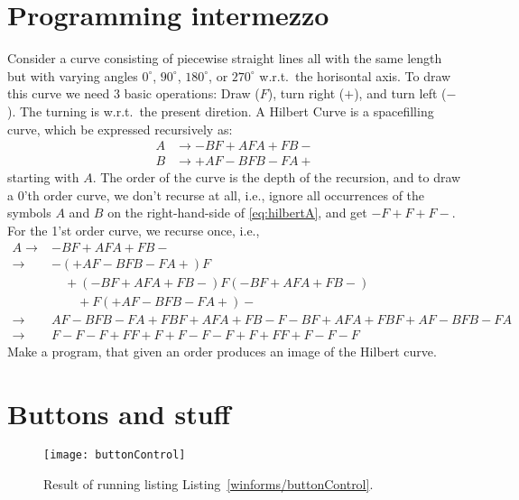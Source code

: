 \section{Programming intermezzo}
\begin{problem}
  Consider a curve consisting of piecewise straight lines all with the same length but with varying angles $0^{\circ}$, $90^{\circ}$, $180^{\circ}$, or $270^{\circ}$ w.r.t.\ the horisontal axis. To draw this curve we need 3 basic operations: Draw ($F$), turn right ($+$), and turn left ($-$). The turning is w.r.t.\ the present diretion. A Hilbert Curve is a spacefilling curve, which be expressed recursively as:
\begin{align}
  A &\rightarrow -BF+AFA+FB-\label{eq:hilbertA}\\
  B &\rightarrow +AF-BFB-FA+\label{eq:hilbertB}
\end{align}
starting with $A$. The order of the curve is the depth of the recursion, and to draw a 0'th order curve, we don't recurse at all, i.e., ignore all occurrences of the symbols $A$ and $B$ on the right-hand-side of \eqref{eq:hilbertA}, and get $-F+F+F-$. For the 1'st order curve, we recurse once, i.e., 
\begin{align*}
  A 
  \rightarrow &-BF+AFA+FB- \\
  \rightarrow &-(+AF-BFB-FA+)F\\
               &\quad+(-BF+AFA+FB-)F(-BF+AFA+FB-)\\
               &\qquad +F(+AF-BFB-FA+)-\\
  \rightarrow &AF-BFB-FA+FBF+AFA+FB-F-BF+AFA+FBF+AF-BFB-FA\\
  \rightarrow &F-F-F+FF+F+F-F-F+F+FF+F-F-F
\end{align*}
Make a program, that given an order produces an image of the Hilbert curve.
\end{problem}
%
%

%
%

\section{Buttons and stuff}

%
%
\begin{figure}
  \centering
  \texttt{[image: buttonControl]}
  \caption{Result of running listing Listing~\ref{winforms/buttonControl}.}
  \label{fig:buttonControl}
\end{figure}

